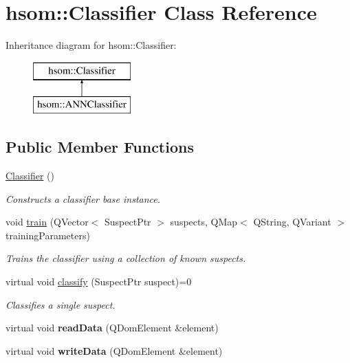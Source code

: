 \hypertarget{classhsom_1_1_classifier}{\section{hsom\-:\-:\-Classifier \-Class \-Reference}
\label{classhsom_1_1_classifier}
}
\-Inheritance diagram for hsom\-:\-:\-Classifier\-:\begin{figure}[H]
\begin{center}
\leavevmode
\includegraphics[height=2.000000cm]{classhsom_1_1_classifier}
\end{center}
\end{figure}
\subsection*{\-Public \-Member \-Functions}
\begin{DoxyCompactItemize}
\item 
\hypertarget{classhsom_1_1_classifier_a10514744eb67348a8dd8f71ec2c1631e}{\hyperlink{classhsom_1_1_classifier_a10514744eb67348a8dd8f71ec2c1631e}{\-Classifier} ()}\label{classhsom_1_1_classifier_a10514744eb67348a8dd8f71ec2c1631e}

\begin{DoxyCompactList}\small\item\em \-Constructs a classifier base instance. \end{DoxyCompactList}\item 
void \hyperlink{classhsom_1_1_classifier_a86175b0c10c80d7e0ea84e608ec49d19}{train} (\-Q\-Vector$<$ \-Suspect\-Ptr $>$ suspects, \-Q\-Map$<$ \-Q\-String, \-Q\-Variant $>$ training\-Parameters)
\begin{DoxyCompactList}\small\item\em \-Trains the classifier using a collection of known suspects. \end{DoxyCompactList}\item 
virtual void \hyperlink{classhsom_1_1_classifier_afe72e6af42ffe1bc2921b3ade481d800}{classify} (\-Suspect\-Ptr suspect)=0
\begin{DoxyCompactList}\small\item\em \-Classifies a single suspect. \end{DoxyCompactList}\item 
\hypertarget{classhsom_1_1_classifier_ad7a6005aea99220ef0391b1155310337}{virtual void {\bfseries read\-Data} (\-Q\-Dom\-Element \&element)}\label{classhsom_1_1_classifier_ad7a6005aea99220ef0391b1155310337}

\item 
\hypertarget{classhsom_1_1_classifier_a526942872ee1edea3ac51e37f0f45231}{virtual void {\bfseries write\-Data} (\-Q\-Dom\-Element \&element)}\label{classhsom_1_1_classifier_a526942872ee1edea3ac51e37f0f45231}

\end{DoxyCompactItemize}
